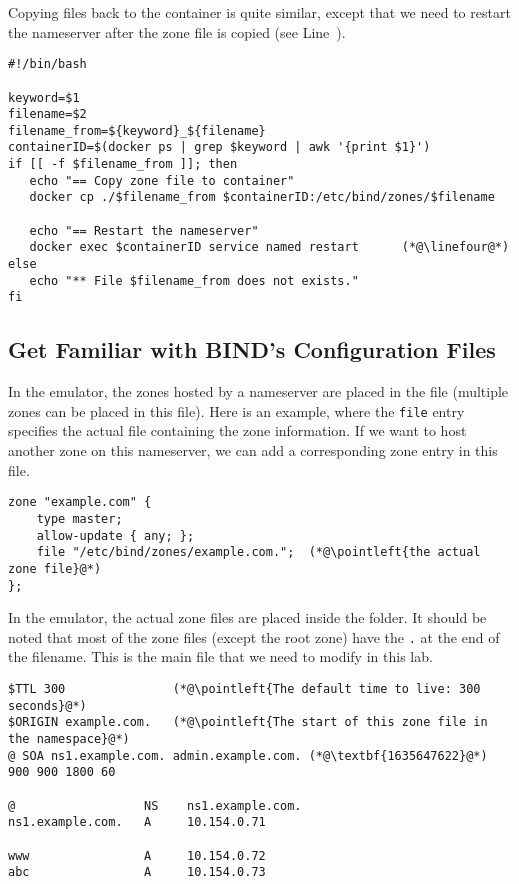Copying files back to  the container is quite similar, except that 
we need to restart the nameserver after the zone file is copied (see Line~\linefour).

\begin{lstlisting}[caption=Sending the zone file to container: \texttt{sendzone.sh}]
#!/bin/bash

keyword=$1
filename=$2
filename_from=${keyword}_${filename}
containerID=$(docker ps | grep $keyword | awk '{print $1}')
if [[ -f $filename_from ]]; then
   echo "== Copy zone file to container"
   docker cp ./$filename_from $containerID:/etc/bind/zones/$filename

   echo "== Restart the nameserver"
   docker exec $containerID service named restart      (*@\linefour@*) 
else
   echo "** File $filename_from does not exists."
fi
\end{lstlisting}
 


\subsection{Get Familiar with BIND's Configuration Files}
\label{dns-inf:subsec:bind-configuration}

In the emulator, the zones hosted by a nameserver are placed 
in the  file (multiple zones
can be placed in this file). Here is 
an example, where the \texttt{file} entry specifies
the actual file containing the zone information.  If we want 
to host another zone on this nameserver, we can add a corresponding
zone entry in this file. 

\begin{lstlisting}
zone "example.com" { 
    type master; 
    allow-update { any; }; 
    file "/etc/bind/zones/example.com.";  (*@\pointleft{the actual zone file}@*) 
};
\end{lstlisting}
 
In the emulator, the actual zone files are placed inside the 
 folder. It should be noted that 
most of the zone files (except the root zone) have the \texttt{.} 
at the end of the filename.  This is the main file that we need
to modify in this lab. 


\begin{lstlisting}
$TTL 300               (*@\pointleft{The default time to live: 300 seconds}@*) 
$ORIGIN example.com.   (*@\pointleft{The start of this zone file in the namespace}@*) 
@ SOA ns1.example.com. admin.example.com. (*@\textbf{1635647622}@*) 900 900 1800 60

@                  NS    ns1.example.com.
ns1.example.com.   A     10.154.0.71

www                A     10.154.0.72
abc                A     10.154.0.73 
\end{lstlisting}

